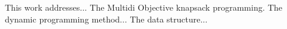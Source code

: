 This work addresses...
The Multidi Objective knapsack programming.
The dynamic programming method...
The data structure...
